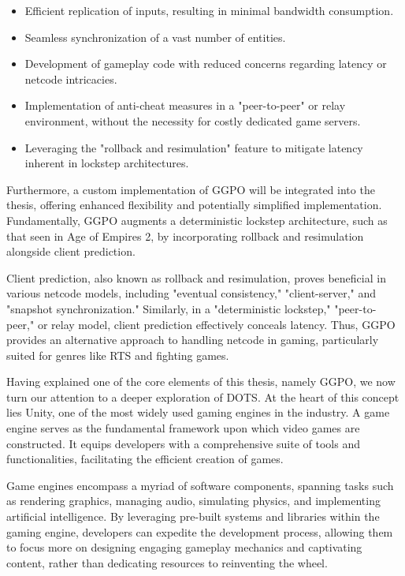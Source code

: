 \begin{itemize}
    \item Efficient replication of inputs, resulting in minimal bandwidth consumption.
    \item Seamless synchronization of a vast number of entities.
    \item Development of gameplay code with reduced concerns regarding latency or netcode intricacies.
    \item Implementation of anti-cheat measures in a "peer-to-peer" or relay environment, without the necessity for costly dedicated game servers.
    \item Leveraging the "rollback and resimulation" feature to mitigate latency inherent in lockstep architectures.
\end{itemize}

Furthermore, a custom implementation of GGPO will be integrated into the thesis, offering enhanced flexibility and potentially simplified implementation. Fundamentally, GGPO augments a deterministic lockstep architecture, such as that seen in Age of Empires 2, by incorporating rollback and resimulation alongside client prediction.

Client prediction, also known as rollback and resimulation, proves beneficial in various netcode models, including "eventual consistency," "client-server," and "snapshot synchronization." Similarly, in a "deterministic lockstep," "peer-to-peer," or relay model, client prediction effectively conceals latency. Thus, GGPO provides an alternative approach to handling netcode in gaming, particularly suited for genres like RTS and fighting games.\newline

Having explained one of the core elements of this thesis, namely GGPO, we now turn our attention to a deeper exploration of DOTS. At the heart of this concept lies Unity, one of the most widely used gaming engines in the industry. A game engine serves as the fundamental framework upon which video games are constructed. It equips developers with a comprehensive suite of tools and functionalities, facilitating the efficient creation of games.

Game engines encompass a myriad of software components, spanning tasks such as rendering graphics, managing audio, simulating physics, and implementing artificial intelligence. By leveraging pre-built systems and libraries within the gaming engine, developers can expedite the development process, allowing them to focus more on designing engaging gameplay mechanics and captivating content, rather than dedicating resources to reinventing the wheel.

